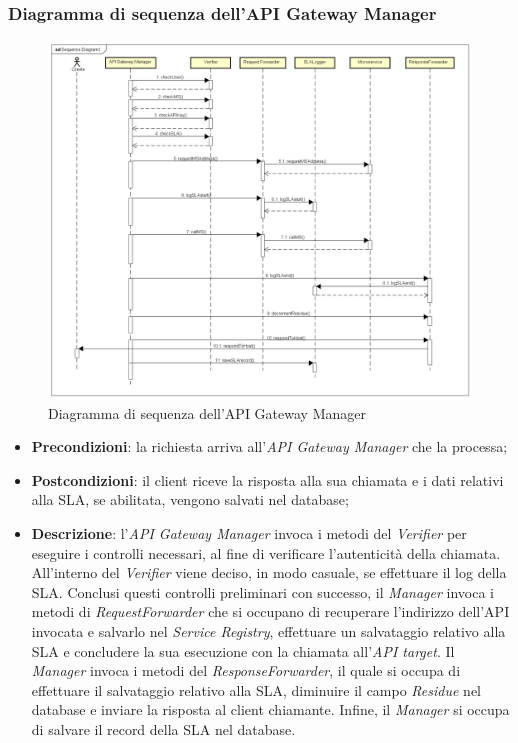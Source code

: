 \newpage
\subsubsection{Diagramma di sequenza dell'API Gateway Manager}
\begin{figure}[h]
	\centering
	\includegraphics[width=1.0\linewidth]{"IMG/Sequence Diagram1"}
	\caption{Diagramma di sequenza dell'API Gateway Manager}
\end{figure}


\begin{itemize}
	\item \textbf{Precondizioni}: la richiesta arriva all'\textit{API Gateway Manager} che la processa;
	\item \textbf{Postcondizioni}: il client riceve la risposta alla sua chiamata e i dati relativi alla SLA, se abilitata, vengono salvati nel database;
	\item \textbf{Descrizione}: l'\textit{API Gateway Manager }invoca i metodi del \textit{Verifier} per eseguire i controlli necessari, al fine di verificare l'autenticità della chiamata. All'interno del \textit{Verifier} viene deciso, in modo casuale, se effettuare il log della SLA.
	Conclusi questi controlli preliminari con successo, il \textit{Manager} invoca i metodi di \textit{RequestForwarder} che si occupano di recuperare l'indirizzo dell'API invocata e salvarlo nel \textit{Service Registry}, effettuare un salvataggio relativo alla SLA e concludere la sua esecuzione con la chiamata all'\textit{API target}. Il \textit{Manager} invoca i metodi del \textit{ResponseForwarder}, il quale si occupa di effettuare il salvataggio relativo alla SLA, diminuire il campo \textit{Residue} nel database e inviare la risposta al client chiamante. Infine, il \textit{Manager} si occupa di salvare il record della SLA nel database.  
\end{itemize}
